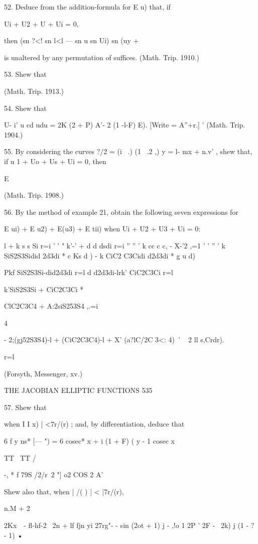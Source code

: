 52. Deduce from the addition-formula for E u) that, if

Ui + U2 + U + Ui = 0,

then (sn ?<! sn l<l — sn u sn Ui) sn (uy + %

is unaltered by any permutation of suffices. (Math. Trip. 1910.)

53. Shew that

(Math. Trip. 1913.)

54. Shew that

U- i' u cd udu = 2K (2 + P) A'- 2 (1 -l-F) E). [Write = A''+r.] '
(Math. Trip. 1904.)

55. By considering the curves ?/2 = (i \ .) (1 \ .2 ,) y = l- mx +
n.v' , shew that, if u 1 + Uo + Us + Ui = 0, then

E %

(Math. Trip. 1908.)

56. By the method of example 21, obtain the following seven
expressions for

E ui) + E u2) + E(u3) + E tii) when Ui + U2 + U3 + Ui = 0:

l + k s s Si r=i ' ' " k'-' + d d dsdi r=i '' '' ' k cc c c, - X-'2
,=1 ' ' '' ' k SiS2S3Sidid 2d3di * c Ks d ) - k CiC2 C3Cidi d2d3di * g
u d)

Pkf SiS2S3Si-did2d3di r=l d d2d3di-lrk' CiC2C3Ci r=l

k'SiS2S3Si + CiC2C3Ci *

ClC2C3C4 + A:2siS253S4 ,.=i

4

- 2;(gj52S3S4)-l + (CiC2C3C4)-l + X' (a?lC/2C 3<: 4)~' ~ 2 ll s,Crdr).

r=l

(Forsyth, Messenger, xv.)

THE JACOBIAN ELLIPTIC FUNCTIONS 535

57. Shew that

when I I x) | <7r/(r) ; and, by differentiation, deduce that

6 f y ns* [— ") = 6 cosec* x + i (1 + F) ( y - 1 cosec x

TT \ TT /

 -, * f 79S /2/r\ 2 "] o2 COS 2 A'

Shew also that, when | /( ) | < |7r/(r),

n.M + 2

2Kx\ \ - fl-hf-2 \ 2n + lf fjn yi 27rg"- - sin (2ot + 1) j - ,!o 1 2P
' 2F - \ 2k) j (1 - ? - 1) •

